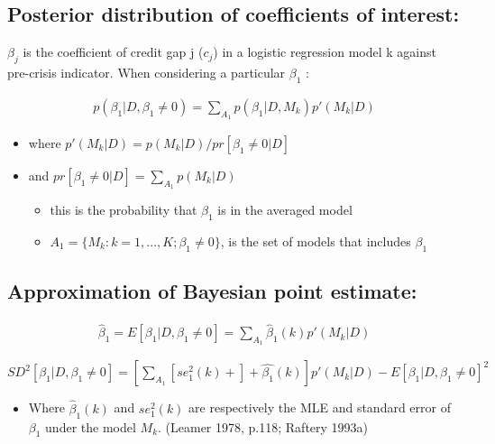 \documentclass[
  12pt,
]{article}
\providecommand{\tightlist}{%
  \setlength{\itemsep}{0pt}\setlength{\parskip}{0pt}}
\begin{document}
\hypertarget{posterior-distribution-of-coefficients-of-interest}{%
\subsection{Posterior distribution of coefficients of interest:}\label{posterior-distribution-of-coefficients-of-interest}}

\(\beta_j\) is the coefficient of credit gap j (\(c_j\)) in a logistic regression model k against pre-crisis indicator. When considering a particular \(\beta_1\) :

\begin{align*}
p(\beta_1|D, \beta_1\ne 0) = \sum\nolimits_{A_1} p(\beta_1|D,M_k)p'(M_k|D)
\end{align*}

\begin{itemize}
\tightlist
\item
  where \(p'(M_k|D)=p(M_k|D)/ pr[\beta_1 \ne 0|D]\)
\item
  and \(pr[\beta_1 \ne 0|D] = \sum\limits_{A_1} p(M_k|D)\)

  \begin{itemize}
  \tightlist
  \item
    this is the probability that \(\beta_1\) is in the averaged model
  \item
    \(A_1= \{M_k: k=1,...,K; \beta_1 \ne 0\}\), is the set of models that includes \(\beta_1\)
  \end{itemize}
\end{itemize}

\hypertarget{approximation-of-bayesian-point-estimate}{%
\subsection{Approximation of Bayesian point estimate:}\label{approximation-of-bayesian-point-estimate}}

\begin{align}
\hat{\beta}_1 = E[\beta_1|D, \beta_1\ne 0] = \sum\limits_{A_1} \hat{\beta}_1(k)p'(M_k|D)
\end{align}

\(SD^2[\beta_1|D, \beta_1\ne 0] =[\sum\limits_{A_1}[se_1^2(k)+]+\hat{\beta_1}(k)]p'(M_k|D) - E[\beta_1|D, \beta_1\ne 0]^2\)

\begin{itemize}
\tightlist
\item
  Where \(\hat{\beta}_1(k)\) and \(se_1^2(k)\) are respectively the MLE and standard error of \(\beta_1\) under the model \(M_k\). (Leamer 1978, p.118; Raftery 1993a)
\end{itemize}
\end{document}

